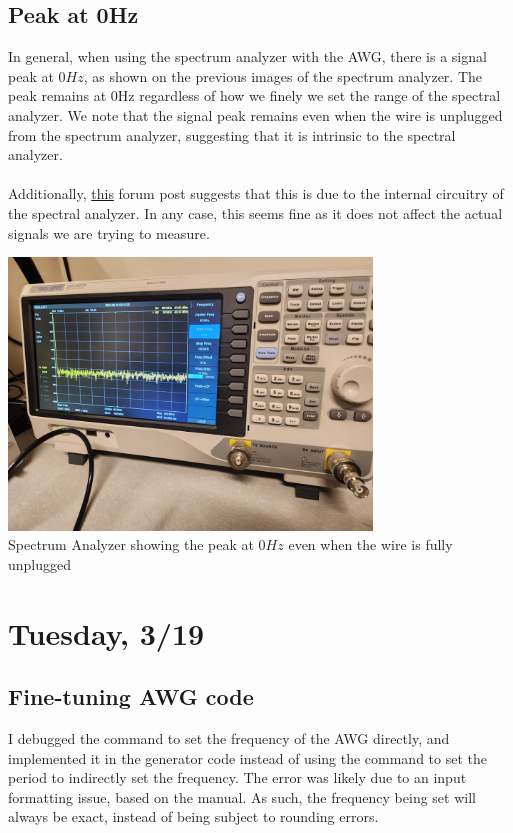 \documentclass{article}
\begin{document}
    \subsection*{Peak at 0Hz}
    In general, when using the spectrum analyzer with the AWG, there is a signal peak at 0$Hz$, as shown on the previous images of the spectrum analyzer. The peak remains at 0Hz regardless of how we finely we set the range of the spectral analyzer. We note that the signal peak remains even when the wire is unplugged from the spectrum analyzer, suggesting that it is intrinsic to the spectral analyzer.\\\\
    Additionally, \href{https://forum.allaboutcircuits.com/threads/spectrum-analyzer-0hz-signal.153650/}{this} forum post suggests that this is due to the internal circuitry of the spectral analyzer. In any case, this seems fine as it does not affect the actual signals we are trying to measure. 
    \begin{mdframed}[backgroundcolor=gray!20, align = center, userdefinedwidth = 4.1in]
    \includegraphics[width = 3.8in]{img/zerosignal.jpg}\\
    Spectrum Analyzer showing the peak at $0Hz$ even when the wire is fully unplugged
    \end{mdframed}
    \section*{Tuesday, 3/19}
    \subsection*{Fine-tuning AWG code}
    I debugged the command to set the frequency of the AWG directly, and implemented it in the generator code instead of using the command to set the period to indirectly set the frequency. The error was likely due to an input formatting issue, based on the manual. As such, the frequency being set will always be exact, instead of being subject to rounding errors.
\end{document}
